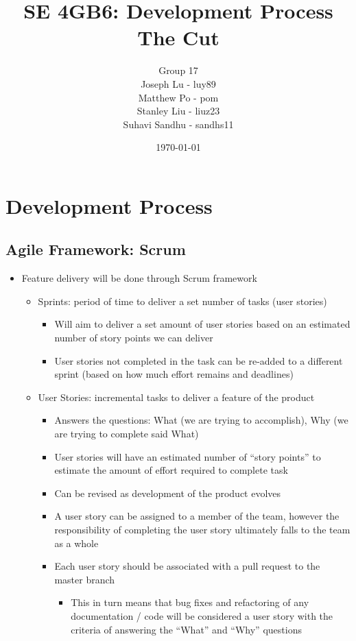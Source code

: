 \documentclass[12pt, titlepage]{article}
\title{SE 4GB6: Development Process\\ The Cut}
\author{Group 17
		\\ Joseph Lu - luy89
		\\ Matthew Po - pom
		\\ Stanley Liu - liuz23
		\\ Suhavi Sandhu - sandhs11
}
\date{\today}
\begin{document}
\maketitle

\section{Development Process}

\subsection{Agile Framework: Scrum}

\begin{itemize}
    \item Feature delivery will be done through Scrum framework
    \begin{itemize}
        \item Sprints: period of time to deliver a set number of tasks (user stories)
        \begin{itemize}
            \item Will aim to deliver a set amount of user stories based on an estimated number of story points we can deliver
            \item User stories not completed in the task can be re-added to a different sprint (based on how much effort remains and deadlines)
        \end{itemize}
        \item User Stories: incremental tasks to deliver a feature of the product
        \begin{itemize}
            \item Answers the questions: What (we are trying to accomplish), Why (we are trying to complete said What)
            \item User stories will have an estimated number of “story points” to estimate the amount of effort required to complete task
            \item Can be revised as development of the product evolves
            \item A user story can be assigned to a member of the team, however the responsibility of completing the user story ultimately falls to the team as a whole
            \item Each user story should be associated with a pull request to the master branch
            \begin{itemize}
                \item This in turn means that bug fixes and refactoring of any documentation / code will be considered a user story with the criteria of answering the “What” and “Why” questions

\end{itemize}
\end{itemize}
\end{itemize}
\end{itemize}
\end{document}
